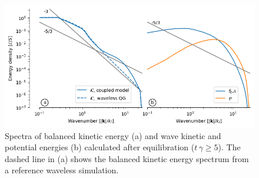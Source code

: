\documentclass[12pt]{article}
\begin{document}
\begin{figure}
\centering
\includegraphics[width=.925\textwidth]{figs/spectrum_qg-niw.png}
\caption{Spectra of balanced kinetic energy (a) and wave kinetic and potential
          energies (b) calculated after equilibration ($t\,\gamma \ge 5$). The
          dashed line in (a) shows the balanced kinetic energy spectrum from a
          reference waveless simulation.}
        \label{spectra_reference}
\end{figure}


\end{document}
